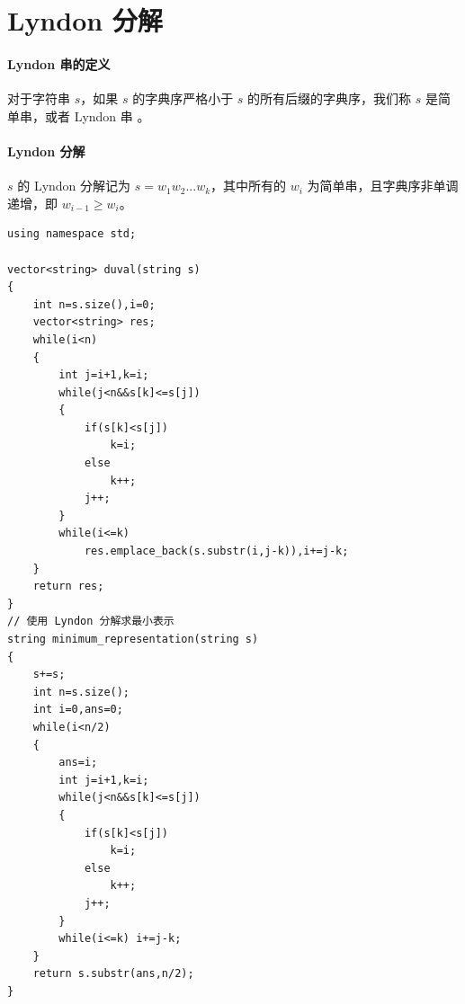 \section{Lyndon 分解}

\paragraph{Lyndon 串的定义} 对于字符串 $s$，如果 $s$ 的字典序严格小于 $s$ 的所有后缀的字典序，我们称 $s$ 是简单串，或者 Lyndon 串 。

\paragraph{Lyndon 分解} $s$ 的 Lyndon 分解记为 $s = w_1w_2...w_k$，其中所有的 $w_i$ 为简单串，且字典序非单调递增，即 $w_{i-1} \ge w_i$。

\begin{verbatim}
using namespace std;

vector<string> duval(string s)
{
    int n=s.size(),i=0;
    vector<string> res;
    while(i<n)
    {
        int j=i+1,k=i;
        while(j<n&&s[k]<=s[j])
        {
            if(s[k]<s[j])
                k=i;
            else
                k++;
            j++;
        }
        while(i<=k)
            res.emplace_back(s.substr(i,j-k)),i+=j-k;
    }
    return res;
}
// 使用 Lyndon 分解求最小表示
string minimum_representation(string s)
{
    s+=s;
    int n=s.size();
    int i=0,ans=0;
    while(i<n/2)
    {
        ans=i;
        int j=i+1,k=i;
        while(j<n&&s[k]<=s[j])
        {
            if(s[k]<s[j])
                k=i;
            else
                k++;
            j++;
        }
        while(i<=k) i+=j-k;
    }
    return s.substr(ans,n/2);
}
\end{verbatim}